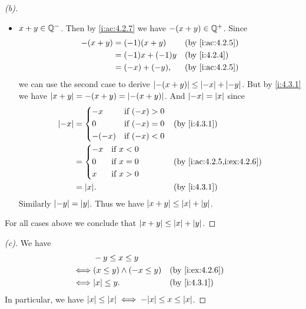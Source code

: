 \begin{proof}[(b)]
\begin{itemize}
\begin{itemize}
          \end{itemize}
    \item \(x + y \in \mathbb{Q}^-\).
          Then by \cref{i:ac:4.2.7} we have \(-(x + y) \in \mathbb{Q}^+\).
          Since
          \begin{align*}
            -(x + y) & = (-1) (x + y)    &  & \by{i:ac:4.2.5} \\
                     & = (-1) x + (-1) y &  & \by{i:4.2.4}    \\
                     & = (-x) + (-y),    &  & \by{i:ac:4.2.5}
          \end{align*}
          we can use the second case to derive \(\left\lvert-(x + y)\right\rvert \leq \left\lvert-x\right\rvert + \left\lvert-y\right\rvert\).
          But by \cref{i:4.3.1} we have \(\left\lvert x + y\right\rvert = -(x + y) = \left\lvert-(x + y)\right\rvert\).
          And \(\left\lvert-x\right\rvert = \left\lvert x\right\rvert\) since
          \begin{align*}
            \abs{-x} & = \begin{dcases}
                           -x    & \text{if } (-x) > 0 \\
                           0     & \text{if } (-x) = 0 \\
                           -(-x) & \text{if } (-x) < 0
                         \end{dcases} &  & \by{i:4.3.1}                     \\
                     & = \begin{dcases}
                           -x & \text{if } x < 0 \\
                           0  & \text{if } x = 0 \\
                           x  & \text{if } x > 0
                         \end{dcases}       &  & \by{i:ac:4.2.5,i:ex:4.2.6} \\
                     & = \abs{x}.                     &  & \by{i:4.3.1}
          \end{align*}
          Similarly \(\left\lvert-y\right\rvert = \left\lvert y\right\rvert\).
          Thus we have \(\left\lvert x + y\right\rvert \leq \left\lvert x\right\rvert + \left\lvert y\right\rvert\).
  \end{itemize}
  For all cases above we conclude that \(\left\lvert x + y\right\rvert \leq \left\lvert x\right\rvert + \left\lvert y\right\rvert\).
\end{proof}

\begin{proof}[(c)]
  We have
  \begin{align*}
         & -y \leq x \leq y                                  \\
    \iff & (x \leq y) \land (-x \leq y) &  & \by{i:ex:4.2.6} \\
    \iff & \abs{x} \leq y.              &  & \by{i:4.3.1}
  \end{align*}
  In particular, we have \(\abs{x} \leq \abs{x} \iff -\abs{x} \leq x \leq \abs{x}\).
\end{proof}

